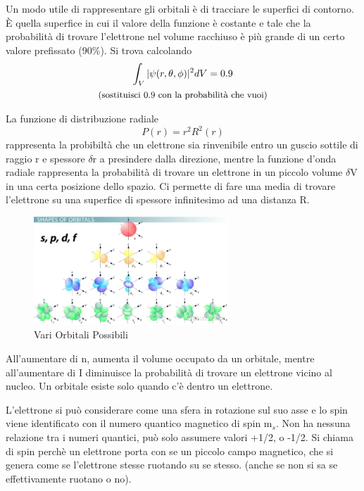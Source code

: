 \documentclass[a4paper]{article}
\begin{document}
Un modo utile di rappresentare gli orbitali è di tracciare le superfici di contorno. È quella superfice in cui il valore della funzione è costante e tale che la probabilità di trovare l'elettrone nel volume racchiuso è più grande di un certo valore prefissato (90\%). Si trova calcolando 
\begin{gather*}
    \int_{V} |\psi(r,\theta,\phi)|^2dV = 0.9 \\
     \text{\small{(sostituisci 0.9 con la probabilità che vuoi)}}
\end{gather*}

La funzione di distribuzione radiale 
\begin{equation*}
    P(r)=r^2R^2(r)
\end{equation*}
rappresenta la probibiltà che un elettrone sia rinvenibile entro un guscio sottile di raggio r e spessore $\delta$r a presindere dalla direzione, mentre la funzione d'onda radiale rappresenta la probabilità di trovare un elettrone in un piccolo volume $\delta$V in una certa posizione dello spazio. Ci permette di fare una media di trovare l'elettrone su una superfice di spessore infinitesimo ad una distanza R. 
\begin{figure}[!ht]
    \centering
    \includegraphics[width=0.65\textwidth]{orbitali.jpg}
    \caption{Vari Orbitali Possibili}
\end{figure}
\FloatBarrier

All'aumentare di n, aumenta il volume occupato da un orbitale, mentre all'aumentare di I diminuisce la probabilità di trovare un elettrone vicino al nucleo. Un orbitale esiste solo quando c'è dentro un elettrone. 

L'elettrone si può considerare come una sfera in rotazione sul suo asse e lo spin viene identificato con il numero quantico magnetico di spin m$_s$. Non ha nessuna relazione tra i numeri quantici, può solo assumere valori +1/2, o -1/2. Si chiama di spin perchè un elettrone porta con se un piccolo campo magnetico, che si genera come se l'elettrone stesse ruotando su se stesso. (anche se non si sa se effettivamente ruotano o no). 
\end{document}
